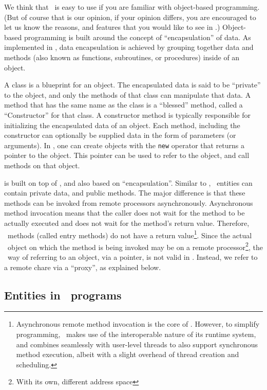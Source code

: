 {We think that \charmpp\ is easy to use if you are familiar with object-based
programming. (But of course that is our opinion, if your opinion differs,
you are encouraged to let us know the reasons, and features that you would
like to see in \charmpp.) Object-based programming is built around the
concept of ``encapsulation'' of data. As implemented in \CC, data
encapsulation is achieved by grouping together data and methods (also known
as functions, subroutines, or procedures) inside of an object.

A class is a blueprint for an object.  The encapsulated data is said to be
``private'' to the object, and only the methods of that class can manipulate
that data. A method that has the same name as the class is a ``blessed''
method, called a ``Constructor'' for that class.  A constructor method is
typically responsible for initializing the encapsulated data of an object.
Each method, including the constructor can optionally be supplied data in
the form of parameters (or arguments). In \CC, one can create objects with
the {\tt new} operator that returns a pointer to the object. This pointer
can be used to refer to the object, and call methods on that object.

\charmpp{} is built on top of \CC, and also based on ``encapsulation''.
Similar to \CC, \charmpp\ entities can contain private data, and public
methods. The major difference is that these methods can be invoked from
remote processors asynchronously.  Asynchronous method invocation means that
the caller does not wait for the method to be actually executed and does not
wait for the method's return value. Therefore, \charmpp\ methods (called
entry methods) do not have a return value\footnote{Asynchronous remote
method invocation is the core of \charmpp. However, to simplify programming,
\charmpp\ makes use of the interoperable nature of its runtime system, and
combines seamlessly with user-level threads to also support synchronous
method execution, albeit with a slight overhead of thread creation and
scheduling.}. Since the actual \charmpp\ object on which the method is being
invoked may be on a remote processor\footnote{With its own, different address
space}, the \CC\ way of referring to an object, via a pointer, is not valid
in \charmpp.  Instead, we refer to a remote chare via a ``proxy'',
as explained below.


\subsection{Entities in \charmpp\ programs}

}
